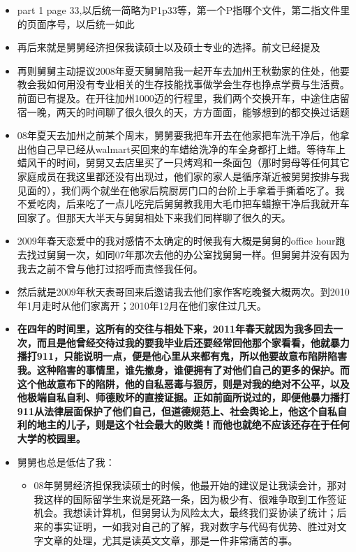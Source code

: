\documentclass[9pt, b5paper]{article}
\begin{document}
\begin{enumerate}
\begin{itemize}
\item part 1 page 33,以后统一简略为P1p33等，第一个P指哪个文件，第二指文件里的页面序号，以后统一如此
\item 再后来就是舅舅经济担保我读硕士以及硕士专业的选择。前文已经提及
\item 再则舅舅主动提议2008年夏天舅舅陪我一起开车去加州王秋勤家的住处，他要教会我如何用没有专业相关的生存技能找事做学会生存也挣点学费与生活费。前面已有提及。在开往加州1000迈的行程里，我们两个交换开车，中途住店留宿一晚，两天的时间聊了很久很久的天，方方面面，能够想到的都交换过话题
\item 08年夏天去加州之前某个周末，舅舅要我把车开去在他家把车洗干净后，他拿出他自己早已经从walmart买回来的车蜡给洗净的车全身都打上蜡。等待车上蜡风干的时间，舅舅又去店里买了一只烤鸡和一条面包（那时舅母等任何其它家庭成员在我这里都还没有出现过，他们家的家人是循序渐近被舅舅按排与我见面的），我们两个就坐在他家后院厨房门口的台阶上手拿着手撕着吃了。我不爱吃肉，后来吃了一点儿吃完后舅舅教我用大毛巾把车蜡擦干净后我就开车回家了。但那天大半天与舅舅相处下来我们同样聊了很久的天。
\item 2009年春天恋爱中的我对感情不太确定的时候我有大概是舅舅的office hour跑去找过舅舅一次，如同07年那次去他的办公室找舅舅一样。但舅舅并没有因为我去之前不曾与他打过招呼而责怪我任何。
\item 然后就是2009年秋天表哥回来后邀请我去他们家作客吃晚餐大概两次。到2010年1月走时从他们家离开；2010年12月在他们家住过几天。
\item \textbf{在四年的时间里，这所有的交往与相处下来，2011年春天就因为我多回去一次，而且是他曾经交待过我的要我毕业后还要经常回他那个家看看，他就暴力播打911，只能说明一点，便是他心里从来都有鬼，所以他要故意布陷阱陷害我。这种陷害的事情里，谁先撤身，谁便拥有了对他们自己的更多的保护。而这个他故意布下的陷阱，他的自私恶毒与狠厉，则是对我的绝对不公平，以及他极端自私自利、师德败坏的直接证据。正如前面所说过的，即便他暴力播打911从法律层面保护了他们自己，但道德规范上、社会舆论上，他这个自私自利的地主的儿子，则是这个社会最大的败类！而他也就绝不应该还存在于任何大学的校园里。}
\item 舅舅也总是低估了我：
\begin{itemize}
\item 08年舅舅经济担保我读硕士的时候，他最开始的建议是让我读会计，那对我这样的国际留学生来说是死路一条，因为极少有、很难争取到工作签证机会。我想读计算机，但舅舅认为风险太大，最终我们妥协读了统计；后来的事实证明，一如我对自己的了解，我对数字与代码有优势、胜过对文字文章的处理，尤其是读英文文章，那是一件非常痛苦的事。

\end{itemize}
\end{itemize}
\end{enumerate}
\end{document}

